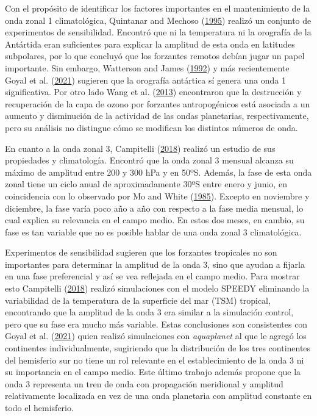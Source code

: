 \documentclass[12pt,oneside,a4paper]{reedthesis}
\begin{document}
Con el propósito de identificar los factores importantes en el mantenimiento de la onda zonal 1 climatológica, Quintanar and Mechoso (\protect\hyperlink{ref-quintanar1995a}{1995}) realizó un conjunto de experimentos de sensibilidad.
Encontró que ni la temperatura ni la orografía de la Antártida eran suficientes para explicar la amplitud de esta onda en latitudes subpolares, por lo que concluyó que los forzantes remotos debían jugar un papel importante.
Sin embargo, Watterson and James (\protect\hyperlink{ref-watterson1992}{1992}) y más recientemente Goyal et al. (\protect\hyperlink{ref-goyal2021a}{2021}) sugieren que la orografía antártica sí genera una onda 1 significativa.
Por otro lado Wang et al. (\protect\hyperlink{ref-wang2013}{2013}) encontraron que la destrucción y recuperación de la capa de ozono por forzantes antropogénicos está asociada a un aumento y disminución de la actividad de las ondas planetarias, respectivamente, pero su análisis no distingue cómo se modifican los distintos números de onda.

En cuanto a la onda zonal 3, Campitelli (\protect\hyperlink{ref-campitelli2018b}{2018}) realizó un estudio de sus propiedades y climatología.
Encontró que la onda zonal 3 mensual alcanza su máximo de amplitud entre 200 y 300 hPa y en 50ºS.
Además, la fase de esta onda zonal tiene un ciclo anual de aproximadamente 30ºS entre enero y junio, en coincidencia con lo observado por Mo and White (\protect\hyperlink{ref-mo1985}{1985}).
Excepto en noviembre y diciembre, la fase varía poco año a año con respecto a la fase media mensual, lo cual explica su relevancia en el campo medio.
En estos dos meses, en cambio, su fase es tan variable que no es posible hablar de una onda zonal 3 climatológica.

Experimentos de sensibilidad sugieren que los forzantes tropicales no son importantes para determinar la amplitud de la onda 3, sino que ayudan a fijarla en una fase preferencial y así se vea reflejada en el campo medio.
Para mostrar esto Campitelli (\protect\hyperlink{ref-campitelli2018b}{2018}) realizó simulaciones con el modelo SPEEDY eliminando la variabilidad de la temperatura de la superficie del mar (TSM) tropical, encontrando que la amplitud de la onda 3 era similar a la simulación control, pero que su fase era mucho más variable.
Estas conclusiones son consistentes con Goyal et al. (\protect\hyperlink{ref-goyal2021a}{2021}) quien realizó simulaciones con \emph{aquaplanet} al que le agregó los continentes individualmente, sugiriendo que la distribución de los tres continentes del hemisferio sur no tiene un rol relevante en el establecimiento de la onda 3 ni su importancia en el campo medio.
Este último trabajo además propone que la onda 3 representa un tren de onda con propagación meridional y amplitud relativamente localizada en vez de una onda planetaria con amplitud constante en todo el hemisferio.
\end{document}
